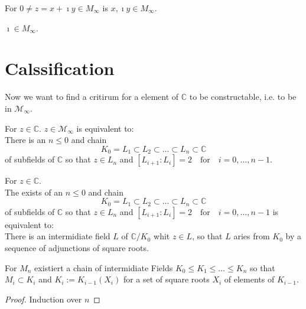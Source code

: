 \begin{lemma}
    \label{construction_re_im}
    For $0 \ne z = x + \imath y \in M_{\infty}$ is $x, \imath y \in M_{\infty}$.
\end{lemma}

\begin{lemma}
    \label{construction_imath}
    $\imath \in M_{\infty}$.
\end{lemma}

\section{Calssification}
Now we want to find a critirum for a element of $\mathbb{C}$ to be constructable, i.e. to be in $\mathcal{M}_{\infty}$.

\begin{theorem}
    \label{thm:Z_in_Minf_imp}
    For $z \in \mathbb{C}$. $z \in \mathcal{M}_{\infty}$ is equivalent to:\\
    There is an $n\le 0$ and chain 
    $$K_0 = L_1 \subset L_2 \subset \ldots \subset L_n \subset \mathbb{C}$$
    of subfields of $\mathbb{C}$ so that $z \in L_n$ and 
    $ [L_{i+1}:L_i] = 2 \quad \text{for} \quad i = 0, \ldots, n-1$.
\end{theorem}

\begin{lemma}
    \label{lem:Z_in_Minf_imp_eq} 
    For $z \in \mathbb{C}$. \\
    The exists of an $n\le 0$ and chain 
    $$K_0 = L_1 \subset L_2 \subset \ldots \subset L_n \subset \mathbb{C}$$
    of subfields of $\mathbb{C}$ so that $z \in L_n$ and 
    $ [L_{i+1}:L_i] = 2 \quad \text{for} \quad i = 0, \ldots, n-1$ is equivalent to:\\
    There is an intermidiate field $L$ of $\mathbb{C}/K_0$ whit $z \in L$, so that $L$ aries from $K_0$ by a sequence of adjunctions of square roots.
\end{lemma}

\begin{lemma}
    \label{lem:Mi_chain}
    For $M_n$ existiert a chain of intermidiate Fields $K_0 \le K_1 \le \ldots \le K_n$ so that $M_i\subset K_i$ and $K_i:= K_{i-1}(X_i)$ for a set of square roots $X_i$ of elements of $K_{i-1}$.
\end{lemma}

\begin{proof}
Induction over $n$

\end{proof}

